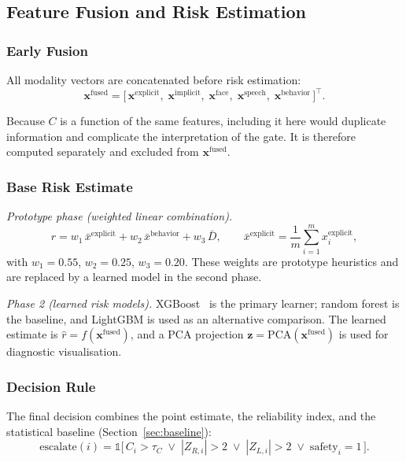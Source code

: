 \documentclass[12pt]{article}
\begin{document}
\subsection{Feature Fusion and Risk Estimation}

\subsubsection{Early Fusion}

All modality vectors are concatenated before risk estimation:
\begin{equation}
\mathbf{x}^{\text{fused}}
= \bigl[\,\mathbf{x}^{\text{explicit}},\; \mathbf{x}^{\text{implicit}},\;
\mathbf{x}^{\text{face}},\; \mathbf{x}^{\text{speech}},\;
\mathbf{x}^{\text{behavior}}\,\bigr]^{\top}.
\end{equation}

\noindent Because $C$ is a function of the same features, including it
here would duplicate information and complicate the interpretation of
the gate. It is therefore computed separately and excluded from
$\mathbf{x}^{\text{fused}}$.

\subsubsection{Base Risk Estimate}

\emph{Prototype phase (weighted linear combination).}
\begin{equation}
r = w_{1}\,\bar{x}^{\text{explicit}}
  + w_{2}\,\bar{x}^{\text{behavior}}
  + w_{3}\,\bar{D},
\qquad
\bar{x}^{\text{explicit}} = \frac{1}{m}\sum_{i=1}^{m}x_i^{\text{explicit}},
\label{eq:linear-risk}
\end{equation}
with $w_{1}=0.55$, $w_{2}=0.25$, $w_{3}=0.20$. These weights are
prototype heuristics and are replaced by a learned model in the second
phase.

\emph{Phase 2 (learned risk models).} XGBoost~\cite{chen2016xgboost} is
the primary learner; random forest is the baseline, and LightGBM is used
as an alternative comparison. The learned estimate is
$\hat{r} = f(\mathbf{x}^{\text{fused}})$, and a PCA projection
$\mathbf{z} = \text{PCA}(\mathbf{x}^{\text{fused}})$ is used for
diagnostic visualisation.

\subsubsection{Decision Rule}

The final decision combines the point estimate, the reliability index,
and the statistical baseline (Section~\ref{sec:baseline}):
\begin{equation}
\text{escalate}(i) =
\mathbb{1}\bigl[\,C_i > \tau_C \;\lor\; |Z_{R,i}| > 2
\;\lor\; |Z_{L,i}| > 2 \;\lor\; \text{safety}_i = 1\,\bigr].
\label{eq:decision}
\end{equation}
\end{document}

